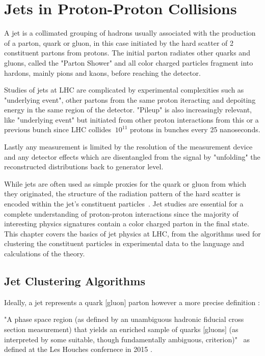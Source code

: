 \chapter{Jets in Proton-Proton Collisions}%

A jet is a collimated grouping of hadrons usually associated with the production of a parton, quark or gluon, in this case initiated by the hard scatter of 2 constituent partons from protons. The initial parton radiates other quarks and gluons, called the "Parton Shower" and all color charged particles fragment into hardons, mainly pions and kaons,  before reaching the detector.

Studies of jets at LHC are complicated by experimental complexities such as "underlying event", other partons from the same proton iteracting and depoiting energy in the same region of the detector. "Pileup" is also increasingly relevant, like "underlying event" but initiated from other proton interactions from this or a previous bunch since LHC collides $~10^{11}$ protons in bunches every 25 nanoseconds.



Lastly any measurement is limited by the resolution of the measurement device and any detector effects which are disentangled from the signal by "unfolding" the reconstructed distributions back to generator level.

While jets are often used as simple proxies for the quark or gluon from which they originated, the structure of the radiation pattern of the hard scatter is encoded within the jet's constituent particles~\cite{Asquith:2018igt}. Jet studies are essential for a complete understanding of proton-proton interactions since the majority of interesting physics signatures contain a color charged parton in the final state. This chapter covers the basics of jet physics at LHC, from the algorithms used for clustering the constituent particles in experimental data to the language and calculations of the theory.




\section{Jet Clustering Algorithms}\label{secSM:ch1}

Ideally, a jet represents a quark [gluon] parton however a more precise definition :

"A phase space region (as defined by an unambiguous
hadronic fiducial cross section measurement) that yields
an enriched sample of quarks [gluons] (as interpreted by some
suitable, though fundamentally ambiguous, criterion)"~\cite{Badger:2016bpw} as defined at the Les Houches confernece in 2015 .

